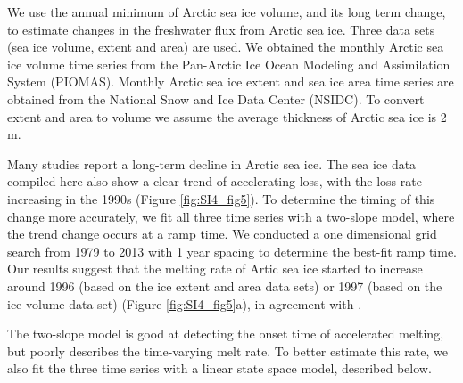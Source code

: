 We use the annual minimum of Arctic sea ice volume, and its long term change, to estimate changes in the freshwater flux from Arctic sea ice.  Three data sets (sea ice volume, extent and area) are used.  We obtained the monthly Arctic sea ice volume time series from the Pan-Arctic Ice Ocean Modeling and Assimilation System (PIOMAS)\cite[]{zhang2003modeling}.  Monthly Arctic sea ice extent and sea ice area time series are obtained from the National Snow and Ice Data Center (NSIDC)\cite[]{fetterer2002app}.  To convert extent and area to volume we assume the average thickness of Arctic sea ice is 2 m. 

Many studies report a long-term decline in Arctic sea ice\cite[]{cavalieri200330,kwok2009thinning,maslowski2012future}.  The sea ice data compiled here also show a clear trend of accelerating loss, with the loss rate increasing in the 1990s (Figure \ref{fig:SI4_fig5}).  To determine the timing of this change more accurately, we fit all three time series with a two-slope model, where the trend change occurs at a ramp time.  We conducted a one dimensional grid search from 1979 to 2013 with 1 year spacing to determine the best-fit ramp time.  Our results suggest that the melting rate of Artic sea ice started to increase around 1996 (based on the ice extent and area data sets) or 1997 (based on the ice volume data set) (Figure \ref{fig:SI4_fig5}a), in agreement with \citet{comiso2008accelerated}.

The two-slope model is good at detecting the onset time of accelerated melting, but poorly describes the time-varying melt rate.  To better estimate this rate, we also fit the three time series with a linear state space model, described below. 

